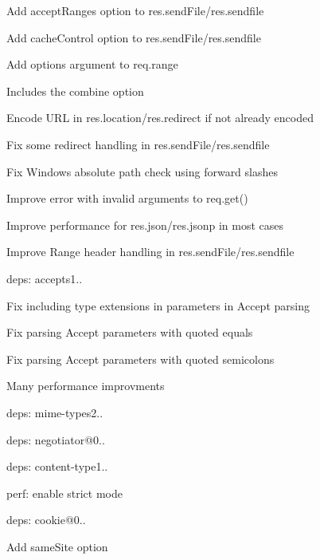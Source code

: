 \begin{DoxyItemize}
\item Add {\ttfamily accept\+Ranges} option to {\ttfamily res.\+send\+File}/{\ttfamily res.\+sendfile}
\item Add {\ttfamily cache\+Control} option to {\ttfamily res.\+send\+File}/{\ttfamily res.\+sendfile}
\item Add {\ttfamily options} argument to {\ttfamily req.\+range}
\begin{DoxyItemize}
\item Includes the {\ttfamily combine} option
\end{DoxyItemize}
\item Encode U\+RL in {\ttfamily res.\+location}/{\ttfamily res.\+redirect} if not already encoded
\item Fix some redirect handling in {\ttfamily res.\+send\+File}/{\ttfamily res.\+sendfile}
\item Fix Windows absolute path check using forward slashes
\item Improve error with invalid arguments to {\ttfamily req.\+get()}
\item Improve performance for {\ttfamily res.\+json}/{\ttfamily res.\+jsonp} in most cases
\item Improve {\ttfamily Range} header handling in {\ttfamily res.\+send\+File}/{\ttfamily res.\+sendfile}
\item deps\+: accepts1..
\begin{DoxyItemize}
\item Fix including type extensions in parameters in {\ttfamily Accept} parsing
\item Fix parsing {\ttfamily Accept} parameters with quoted equals
\item Fix parsing {\ttfamily Accept} parameters with quoted semicolons
\item Many performance improvments
\item deps\+: mime-\/types2..
\item deps\+: negotiator@0..
\end{DoxyItemize}
\item deps\+: content-\/type1..
\begin{DoxyItemize}
\item perf\+: enable strict mode
\end{DoxyItemize}
\item deps\+: cookie@0..
\begin{DoxyItemize}
\item Add {\ttfamily same\+Site} option

\end{DoxyItemize}
\end{DoxyItemize}
